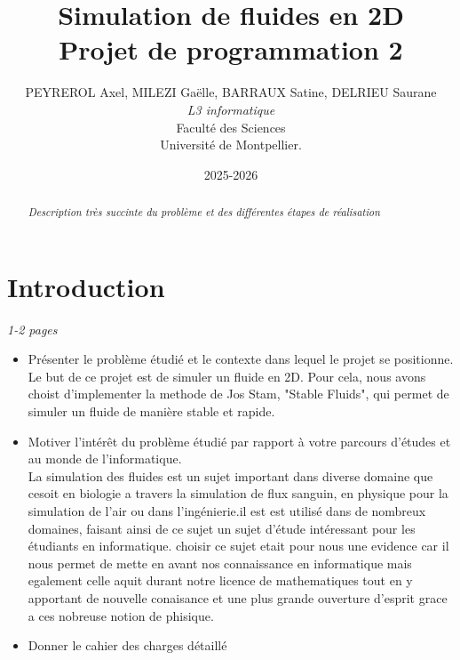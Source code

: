 \documentclass[a4paper]{article}
\title{  Simulation de fluides en 2D\\         %
  Projet de programmation 2}
\author{ PEYREROL Axel, MILEZI Gaëlle, BARRAUX Satine, DELRIEU Saurane\\
  \emph{L3 informatique}\\
  Faculté des Sciences\\
Université de Montpellier.}
\date{2025-2026}
\begin{document}
\maketitle                    %


\begin{abstract}     %

  \emph{Description très succinte du problème et des différentes étapes de réalisation}

\end{abstract}
\newpage
\tableofcontents
\newpage
\section*{Introduction} %
\emph{1-2 pages}
\begin{itemize}%
\item Présenter le problème étudié et le contexte dans lequel le projet se positionne.\\
   Le but de ce projet est de simuler un fluide en 2D. 
  Pour cela, nous avons choist d'implementer la methode
  de Jos Stam, "Stable Fluids", qui permet de simuler un 
  fluide de manière stable et rapide.
\item Motiver l'intérêt du problème étudié par rapport à votre parcours d'études et au monde de l'informatique.\\
    La simulation des fluides est un sujet important dans diverse domaine que cesoit
    en biologie a travers la simulation de flux sanguin, en physique pour la simulation de l'air 
    ou dans l'ingénierie.il est est utilisé dans de nombreux domaines, faisant ainsi de ce sujet
    un sujet d'étude intéressant pour les étudiants en informatique.
    choisir ce sujet etait pour nous une evidence car il nous permet de mette 
    en avant nos connaissance en informatique mais egalement celle aquit durant 
    notre licence de mathematiques tout en y apportant de nouvelle conaisance
    et une plus grande ouverture d'esprit grace a ces nobreuse notion de phisique.
\item Donner le cahier des charges détaillé
\end{itemize}
\end{document}
